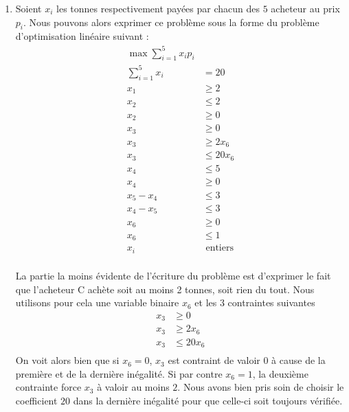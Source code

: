 \begin{enumerate}
    \begin{solution}
      \begin{enumerate}
      	\item Soient $x_i$ les tonnes respectivement payées par chacun des $5$ acheteur au prix $p_i$. Nous pouvons alors exprimer ce problème sous la forme du problème d'optimisation linéaire suivant :
      	\begin{align*}
            \max \sum_{i=1}^5 x_i p_i\\
            \sum_{i=1}^5 x_i & = 20\\
            x_1 & \geq 2\\
            x_2 & \leq 2\\
            x_2 & \geq 0\\
            x_3 & \geq 0\\
            x_3 & \geq 2x_6\\
            x_3 & \leq 20x_6\\
            x_4 & \leq 5\\
            x_4 & \geq 0\\
            x_5-x_4 & \leq 3\\
            x_4-x_5 & \leq 3\\
            x_6 & \geq 0\\
            x_6 & \leq 1\\
            x_i & \text{ entiers}\\
          \end{align*}
          
          La partie la moins évidente de l'écriture du problème est d'exprimer le fait que l'acheteur C achète soit au moins 2 tonnes, soit rien du tout. Nous utilisons pour cela une variable binaire $x_6$ et les 3 contraintes suivantes 
          \begin{align*}
          x_3 & \geq 0\\
            x_3 & \geq 2x_6\\
            x_3 & \leq 20x_6\\
             \end{align*}
           On voit alors bien que si $x_6 = 0$, $x_3$ est contraint de valoir $0$ à cause de la première et de la dernière inégalité. Si par contre $x_6 = 1$, la deuxième contrainte force $x_3$ à valoir au moins $2$. Nous avons bien pris soin de choisir le coefficient $20$ dans la dernière inégalité pour que celle-ci soit toujours vérifiée.\\
           

\end{enumerate}
\end{solution}
\end{enumerate}
